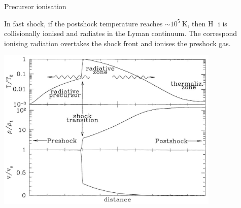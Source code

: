 \begin{frame}{Precursor ionisation}

In fast shock, if the postshock temperature reaches $\sim 10^5~$K,
then H~{\sc\,i} is collisionally ionised and radiates in the Lyman
continuum. The correspond ionising radiation overtakes the shock front
and ionises the preshock gas. 


\begin{center}
  \includegraphics[width=0.8\textwidth,height=!]{./E/fig_Jshocks.jpg}
\end{center}

\end{frame}






